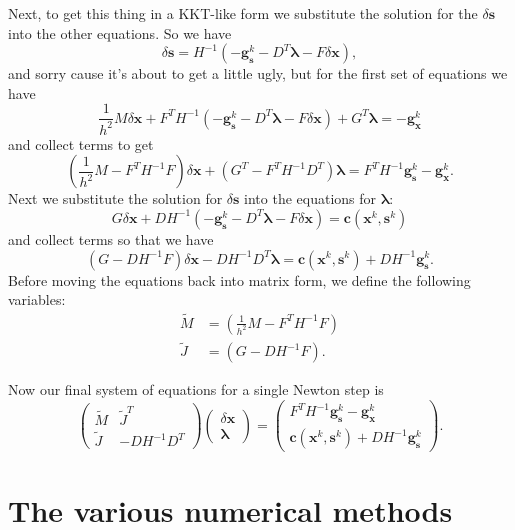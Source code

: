 \documentclass[letterpaper,12pt]{article}
\theoremstyle{remark}
\newcommand{\x}{\mathbf{x}}
\newcommand{\C}{\mathbf{c}}
\newcommand{\s}{\mathbf{s}}
\newcommand{\la}{\mathbf{\lambda}}
\newcommand{\dx}{\delta \x}
\newcommand{\ds}{\delta \s}
\newcommand{\gx}{ {\mathbf{g}_\x^k} }
\newcommand{\gs}{ {\mathbf{g}_\s^k} }
\begin{document}
Next, to get this thing in a KKT-like form we substitute the solution for the $\ds$ into the other equations. So we have
\begin{equation}
\ds = {H}^{-1}\left(-\gs - D^T \la - F\dx \right),
\end{equation}
and sorry cause it's about to get a little ugly, but for the first set of equations we have
\begin{equation*}
\frac{1}{h^2}M\dx + F^TH^{-1}\left(-\gs - D^T\la - F\dx \right) +G^T \la = -\gx
\end{equation*}
and collect terms to get
\begin{equation}
\left(\frac{1}{h^2}M - F^TH^{-1}F \right)\dx + (G^T - F^TH^{-1}D^T)\la = 
F^TH^{-1}\gs -\gx.
\end{equation}
Next we substitute the solution for $\ds$ into the equations for $\la$:
\begin{equation*}
G\dx + DH^{-1}\left(-\gs - D^T\la - F\dx\right) = \C (\x^k, \s^k)
\end{equation*}
and collect terms so that we have
\begin{equation}
(G - DH^{-1}F)\dx - DH^{-1}D^T\la = \C (\x^k, \s^k) + DH^{-1}\gs.
\end{equation}
Before moving the equations back into matrix form, we define the following variables:
\begin{align}
\tilde{M} &= (\frac{1}{h^2}M - F^TH^{-1}F) \\
\tilde{J} &= (G - DH^{-1}F). 
\end{align}

Now our final system of equations for a single Newton step is
\begin{equation}
\begin{pmatrix}
\tilde{M} & \tilde{J}^T \\
\tilde{J} & -DH^{-1}D^T 
\end{pmatrix}
\begin{pmatrix}
\dx \\
\la
\end{pmatrix} =
\begin{pmatrix}
F^TH^{-1}\gs -\gx \\
\C (\x^k, \s^k) + DH^{-1}\gs
\end{pmatrix}.
\end{equation}

\section{The various numerical methods}
\end{document}
